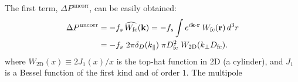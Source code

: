                                                                                                                                                                                                                                                                           The first term, $\Delta P^\mathrm{uncorr}$, can be easily obtained:
                                                                                                                                                                                                                                                                          \begin{align} \label{eq:delp_uncorr}
                                                                                                                                                                                                                                                                          \Delta P^\mathrm{uncorr} &=  - f_s\, \widehat{W_\mathrm{fc}}({\bf k}) = 
                                                                                                                                                                                                                                                                          -f_s \int e^{i {\bf k} \cdot {\bf r}} \: W_\mathrm{fc}({\bf r}) \, d^3{r} \nonumber \\
                                                                                                                                                                                                                                                                          & = -f_s \ 2 \pi \delta_D(k_\parallel) \; \pi D_\mathrm{fc}^2 \; W_\mathrm{2D}(k_\perp D_\mathrm{fc}). 
                                                                                                                                                                                                                                                                          \end{align}
                                                                                                                                                                                                                                                                          where $W_\mathrm{2D}(x) \equiv 2 J_1(x)/x$ is the top-hat function in 2D (a cylinder), and 
                                                                                                                                                                                                                                                                           $J_1$ is a Bessel function of the first kind and of order $1$. The multipole 
